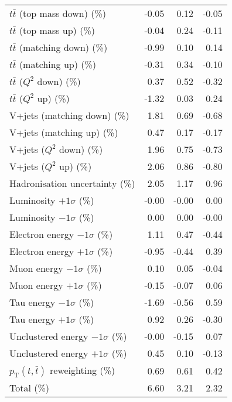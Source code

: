 \begin{table}[htbp]
{\begin{tabular}{lrrr}
$t\bar{t}$ (top mass down) (\%) & -0.05 & 0.12 & -0.05 \\ 
$t\bar{t}$ (top mass up) (\%) & -0.04 & 0.24 & -0.11 \\ 
$t\bar{t}$ (matching down) (\%) & -0.99 & 0.10 & 0.14 \\ 
$t\bar{t}$ (matching up) (\%) & -0.31 & 0.34 & -0.10 \\ 
$t\bar{t}$ ($Q^{2}$ down) (\%) & 0.37 & 0.52 & -0.32 \\ 
$t\bar{t}$ ($Q^{2}$ up) (\%) & -1.32 & 0.03 & 0.24 \\ 
V+jets (matching down) (\%) & 1.81 & 0.69 & -0.68 \\ 
V+jets (matching up) (\%) & 0.47 & 0.17 & -0.17 \\ 
V+jets ($Q^{2}$ down) (\%) & 1.96 & 0.75 & -0.73 \\ 
V+jets ($Q^{2}$ up) (\%) & 2.06 & 0.86 & -0.80 \\ 
Hadronisation uncertainty (\%) & 2.05 & 1.17 & 0.96 \\ 
Luminosity $+1\sigma$ (\%) & -0.00 & -0.00 & 0.00 \\ 
Luminosity $-1\sigma$ (\%) & 0.00 & 0.00 & -0.00 \\ 
Electron energy $-1\sigma$ (\%) & 1.11 & 0.47 & -0.44 \\ 
Electron energy $+1\sigma$ (\%) & -0.95 & -0.44 & 0.39 \\ 
Muon energy $-1\sigma$ (\%) & 0.10 & 0.05 & -0.04 \\ 
Muon energy $+1\sigma$ (\%) & -0.15 & -0.07 & 0.06 \\ 
Tau energy $-1\sigma$ (\%) & -1.69 & -0.56 & 0.59 \\ 
Tau energy $+1\sigma$ (\%) & 0.92 & 0.26 & -0.30 \\ 
Unclustered energy $-1\sigma$ (\%) & -0.00 & -0.15 & 0.07 \\ 
Unclustered energy $+1\sigma$ (\%) & 0.45 & 0.10 & -0.13 \\ 
$p_\mathrm{T}(t,\bar{t})$ reweighting (\%) & 0.69 & 0.61 & 0.42 \\ 
\hline 
Total (\%) & 6.60  & 3.21  & 2.32 \\ 
\hline 
\end{tabular}
}
\end{table}
